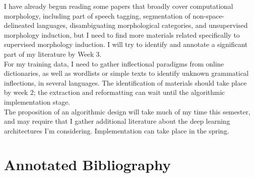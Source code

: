 \documentclass{article}
\begin{document}
I have already begun reading some papers that broadly cover computational morphology, including part of speech tagging, segmentation of non-space-delineated languages, disambiguating morphological categories, and unsupervised morphology induction, but I need to find more materials related specifically to supervised morphology induction. I will try to identify and annotate a significant part of my literature by Week 3. \\

For my training data, I need to gather inflectional paradigms from online dictionaries, as well as wordlists or simple texts to identify unknown grammatical inflections, in several languages. The identification of materials should take place by week 2; the extraction and reformatting can wait until the algorithmic implementation stage. \\

The proposition of an algorithmic design will take much of my time this semester, and may require that I gather additional literature about the deep learning architectures I'm considering. Implementation can take place in the spring. \\

\section*{Annotated Bibliography}
\end{document}
